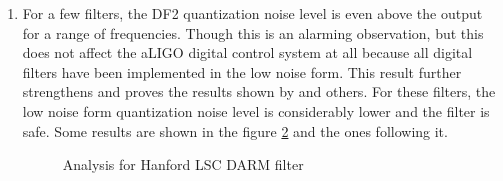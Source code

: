 \documentclass[colorlinks=true,pdfstartview=FitV,linkcolor=blue,
            citecolor=red,urlcolor=magenta]{ligodoc}
\begin{document}
\begin{enumerate}
\begin{figure}[H]
			  \centering
			  \def\svgscale{0.5}
			  \tiny{
			  
			  }
			  \caption{Analysis for Hanford SUS ITMX filter}
			 \label{good_sus}
		\end{figure}
		Suspension subsytem's digital controller consists of some complex filters and one of those has been shown in figure \ref{good_sus}. As mentioned above, the SNR falls down steeply as the output of the filter is rolled off at higher frequencies. But at lower frequencies, we observe that the SNR is maintained at more than atleast $10^{6}$, which is good. The following figure shows the quantization noise level for the same filter at Livingston site. 
		\begin{figure}[H]
% 			
			  \centering
			  \def\svgscale{0.5}		 
			  \tiny{ 
			  
			  }
			  \caption{Analysis for Livingston SUS ITMX filter}
		\end{figure}
% 
%			  
% 
%			  
%		
		\item For a few filters, the DF2 quantization noise level is even above the output for a range of frequencies.  Though this is an alarming observation, but this does not affect the aLIGO digital control system at all because all digital filters have been implemented in the low noise form. This result further strengthens and proves the results shown by \cite{Matts} and others. For these filters, the low noise form quantization noise level is considerably lower and the filter is safe. Some results are shown in the figure \ref{dfbad} and the ones following it.
		\begin{figure}[H]
 
			  \centering
			  \def\svgscale{0.5}
			  \tiny{
			  
			  }
			  \caption{Analysis for Hanford LSC DARM filter}
			 \label{dfbad}
		\end{figure}
		\begin{figure}[H]
 

\end{figure}
\end{enumerate}
\end{document}
